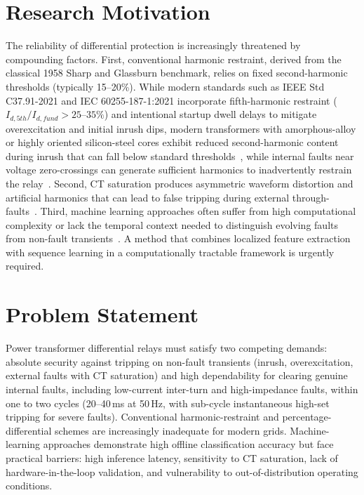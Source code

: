 \documentclass[12pt,a4paper,oneside]{report}
\begin{document}
\section{Research Motivation}
The reliability of differential protection is increasingly threatened by compounding factors. First, conventional harmonic restraint, derived from the classical 1958 Sharp and Glassburn benchmark, relies on fixed second-harmonic thresholds (typically 15--20\%). While modern standards such as IEEE Std C37.91-2021 and IEC 60255-187-1:2021 incorporate fifth-harmonic restraint ($I_{d,5th}/I_{d,fund} > 25\text{--}35\%$) and intentional startup dwell delays to mitigate overexcitation and initial inrush dips, modern transformers with amorphous-alloy or highly oriented silicon-steel cores exhibit reduced second-harmonic content during inrush that can fall below standard thresholds~\cite{ref4}, while internal faults near voltage zero-crossings can generate sufficient harmonics to inadvertently restrain the relay~\cite{ref8}. Second, CT saturation produces asymmetric waveform distortion and artificial harmonics that can lead to false tripping during external through-faults~\cite{ref9}. Third, machine learning approaches often suffer from high computational complexity or lack the temporal context needed to distinguish evolving faults from non-fault transients~\cite{ref11}. A method that combines localized feature extraction with sequence learning in a computationally tractable framework is urgently required.

\section{Problem Statement}
Power transformer differential relays must satisfy two competing demands: absolute security against tripping on non-fault transients (inrush, overexcitation, external faults with CT saturation) and high dependability for clearing genuine internal faults, including low-current inter-turn and high-impedance faults, within one to two cycles (20--40\,ms at 50\,Hz, with sub-cycle instantaneous high-set tripping for severe faults). Conventional harmonic-restraint and percentage-differential schemes are increasingly inadequate for modern grids. Machine-learning approaches demonstrate high offline classification accuracy but face practical barriers: high inference latency, sensitivity to CT saturation, lack of hardware-in-the-loop validation, and vulnerability to out-of-distribution operating conditions.
\end{document}
